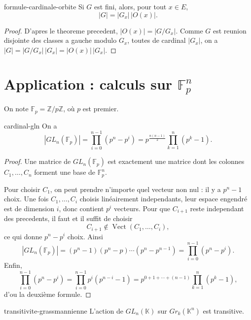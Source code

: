 \begin{corollaire}{}{formule-cardinale-orbite}
    Si $G$ est fini, alors, pour tout $x \in E$,
    \[
        |G|=|G_x|\,|O(x)|.
    \]
\end{corollaire}

\begin{proof}
    D'apres le theoreme precedent, $|O(x)|=|G/G_x|$. Comme $G$ est reunion
    disjointe des classes a gauche modulo $G_x$, toutes de cardinal $|G_x|$,
    on a $|G|=|G/G_x|\,|G_x|=|O(x)|\,|G_x|$.
\end{proof}

\section*{Application : calculs sur $\mathbb{F}_p^n$}

On note $\mathbb{F}_p=\mathbb{Z}/p\mathbb{Z}$, où $p$ est premier.

\begin{theoreme}{}{cardinal-gln}
    On a
    \[
        |GL_n(\mathbb{F}_p)|
        = \prod_{i=0}^{n-1}(p^n-p^i)
        = p^{\frac{n(n-1)}{2}}\prod_{k=1}^n(p^k-1).
    \]
\end{theoreme}

\begin{proof}
    Une matrice de $GL_n(\mathbb{F}_p)$ est exactement une matrice dont les
    colonnes $C_1,\dots,C_n$ forment une base de $\mathbb{F}_p^n$.

    Pour choisir $C_1$, on peut prendre n'importe quel vecteur non nul :
    il y a $p^n-1$ choix. Une fois $C_1,\dots,C_i$ choisis linéairement
    independants, leur espace engendré est de dimension $i$, donc contient
    $p^i$ vecteurs. Pour que $C_{i+1}$ reste independant des precedents, il
    faut et il suffit de choisir
    \[
        C_{i+1}\notin \operatorname{Vect}(C_1,\dots,C_i),
    \]
    ce qui donne $p^n-p^i$ choix. Ainsi
    \[
        |GL_n(\mathbb{F}_p)|=(p^n-1)(p^n-p)\cdots(p^n-p^{n-1})
        =\prod_{i=0}^{n-1}(p^n-p^i).
    \]
    Enfin,
    \[
        \prod_{i=0}^{n-1}(p^n-p^i)
        = \prod_{i=0}^{n-1}p^i(p^{n-i}-1)
        = p^{0+1+\cdots+(n-1)}\prod_{k=1}^n(p^k-1),
    \]
    d'ou la deuxième formule.
\end{proof}

\begin{proposition}{}{transitivite-grassmannienne}
    L'action de $GL_n(\mathbb{K})$ sur $Gr_k(\mathbb{K}^n)$ est transitive.
\end{proposition}


